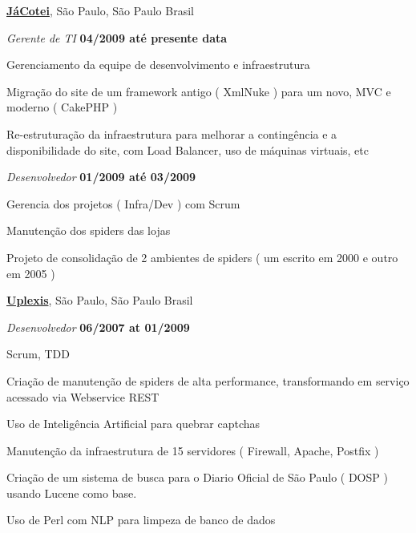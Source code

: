 \documentclass[10pt]{article}
\newenvironment{outerlist}[1][\enskip\textbullet]%
        {\begin{itemize}[#1]}{\end{itemize}%
         \vspace{-.6\baselineskip}}
\newenvironment{innerlist}[1][\enskip\textbullet]%
        {\begin{compactitem}[#1]}{\end{compactitem}}
\begin{document}
\href{http://www.jacotei.com.br/}{\textbf{JáCotei}}, 
São Paulo, São Paulo Brasil

\begin{outerlist}
\item[] \textit{Gerente de TI}%
        \hfill \textbf{04/2009 até presente data}
\begin{innerlist}
\item Gerenciamento da equipe de desenvolvimento e infraestrutura
\item Migração do site de um framework antigo ( XmlNuke ) para um novo, MVC e
moderno ( CakePHP )
\item Re-estruturação da infraestrutura para melhorar a contingência e a
disponibilidade do site, com Load Balancer, uso de máquinas virtuais, etc
\end{innerlist}
\end{outerlist}

\begin{outerlist}
\item[] \textit{Desenvolvedor}%
        \hfill \textbf{01/2009 até 03/2009}
\begin{innerlist}
\item Gerencia dos projetos ( Infra/Dev )  com Scrum
\item Manutenção dos spiders das lojas
\item Projeto de consolidação de 2 ambientes de spiders ( um escrito em 2000 e
outro em 2005 )
\end{innerlist}
\end{outerlist}



\href{http://www.uplexis.com/}{\textbf{Uplexis}}, 
São Paulo, São Paulo Brasil
\begin{outerlist}
\item[] \textit{Desenvolvedor}%
        \hfill \textbf{06/2007 at 01/2009}
\begin{innerlist}
\item Scrum, TDD
\item Criação de manutenção de spiders de alta performance, transformando em
serviço acessado via Webservice REST
\item Uso de Inteligência Artificial para quebrar captchas
\item Manutenção da infraestrutura de 15 servidores ( Firewall, Apache,
Postfix )
\item Criação de um sistema de busca para o Diario Oficial de São Paulo ( DOSP
) usando Lucene como base.
\item Uso de Perl com NLP para limpeza de banco de dados
\end{innerlist}
\end{outerlist}
\end{document}
